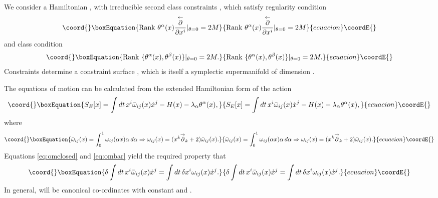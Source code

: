 \documentclass[a4paper,12pt]{article}
\theoremstyle{definition}
\theoremstyle{remark}
\numberwithin{equation}{section}
\providecommand{\al}{\alpha}
\providecommand{\be}{\beta}
\providecommand{\de}{\delta}
\providecommand{\la}{\lambda}
\providecommand{\om}{\omega}
\providecommand{\Imp}{\Rightarrow}
\providecommand{\dx}{\dot{x}}
\providecommand{\pl}{\overset{\leftarrow}{\partial}}
\providecommand{\pr}{\overset{\rightarrow}{\partial}}
\begin{document}
We consider a Hamiltonian \coordHE{}, with \coordHE{} irreducible second
class constraints \myHighlight{$\theta^{\al}(x)$}\coordHE{}, which satisfy regularity
condition
\begin{equation}\coord{}\boxEquation{\label{eq:regular}
\text{Rank } \theta^{\al}(x){\frac{\pl}{\partial x^i}}
|_{\theta=0}=2M
}{\text{Rank } \theta^{\al}(x){\frac{\pl}{\partial x^i}}
|_{\theta=0}=2M
}{ecuacion}\coordE{}\end{equation}
and class condition
\begin{equation}\coord{}\boxEquation{\label{eq:classcnd}
\text{Rank }{\{\theta^{\al}(x),\theta^{\be}(x)\}}|_{\theta=0}=2M.
}{\text{Rank }{\{\theta^{\al}(x),\theta^{\be}(x)\}}|_{\theta=0}=2M.
}{ecuacion}\coordE{}\end{equation}
Constraints \myHighlight{$\theta^{\al}=0$}\coordHE{} determine a constraint surface
\myHighlight{$\Gamma$}\coordHE{}, which is itself a symplectic supermanifold of dimension
\coordHE{}.

The equations of motion can be calculated from the extended
Hamiltonian form of the action
\begin{equation}\coord{}\boxEquation{
S_E[x]=\int{dt\, x^i \bar{\om}_{ij}(x) \dx^j - H(x)
-\la_{\al}\theta^{\al}(x)},
}{
S_E[x]=\int{dt\, x^i \bar{\om}_{ij}(x) \dx^j - H(x)
-\la_{\al}\theta^{\al}(x)},
}{ecuacion}\coordE{}\end{equation}
where \cite{Batalin:1998pz}
\begin{equation}\coord{}\boxEquation{\label{eq:ombar}
\bar{\om}_{ij}(x)=\int_{0}^{1}{\om_{ij}(\al x)\al \, d\al} \Imp
\om_{ij}(x)=(x^k\pr_k+2)\bar{\om}_{ij}(x).
}{\bar{\om}_{ij}(x)=\int_{0}^{1}{\om_{ij}(\al x)\al \, d\al} \Imp
\om_{ij}(x)=(x^k\pr_k+2)\bar{\om}_{ij}(x).
}{ecuacion}\coordE{}\end{equation}
Equations \eqref{eq:omclosed} and \eqref{eq:ombar} yield the
required property that
\begin{equation}\coord{}\boxEquation{
\de \int{dt \, x^i\bar{\om}_{ij}(x)\dx^j}=\int{dt\, \de x^i
\om_{ij}(x)\dx^j}.
}{
\de \int{dt \, x^i\bar{\om}_{ij}(x)\dx^j}=\int{dt\, \de x^i
\om_{ij}(x)\dx^j}.
}{ecuacion}\coordE{}\end{equation}
In general, \coordHE{} will be canonical co-ordinates with constant
\myHighlight{$\om^{ij}$}\coordHE{} and \myHighlight{$\bar{\om}^{ij}=\frac{1}{2} \om^{ij}$}\coordHE{}.
\end{document}
